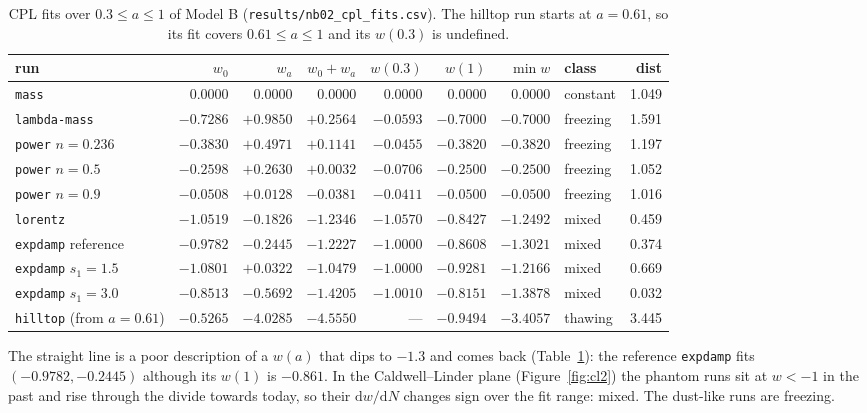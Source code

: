 \documentclass[11pt,a4paper]{article}
\newcommand{\dd}{\mathrm{d}}
\begin{document}
\begin{table}[htbp]
\centering\small
\caption{CPL fits over $0.3\le a\le1$ of Model B (\texttt{results/nb02\_cpl\_fits.csv}). The hilltop
run starts at $a=0.61$, so its fit covers $0.61\le a\le1$ and its $w(0.3)$ is undefined.}
\label{tab:fitsB}
\setlength{\tabcolsep}{4pt}
\begin{tabular}{@{}l r r r r r r l r@{}}
\toprule
run & $w_0$ & $w_a$ & $w_0+w_a$ & $w(0.3)$ & $w(1)$ & $\min w$ & class & dist \\
\midrule
\texttt{mass} & $0.0000$ & $0.0000$ & $0.0000$ & $0.0000$ & $0.0000$ & $0.0000$ & constant & 1.049 \\
\texttt{lambda-mass} & $-0.7286$ & $+0.9850$ & $+0.2564$ & $-0.0593$ & $-0.7000$ & $-0.7000$ & freezing & 1.591 \\
\texttt{power} $n=0.236$ & $-0.3830$ & $+0.4971$ & $+0.1141$ & $-0.0455$ & $-0.3820$ & $-0.3820$ & freezing & 1.197 \\
\texttt{power} $n=0.5$ & $-0.2598$ & $+0.2630$ & $+0.0032$ & $-0.0706$ & $-0.2500$ & $-0.2500$ & freezing & 1.052 \\
\texttt{power} $n=0.9$ & $-0.0508$ & $+0.0128$ & $-0.0381$ & $-0.0411$ & $-0.0500$ & $-0.0500$ & freezing & 1.016 \\
\texttt{lorentz} & $-1.0519$ & $-0.1826$ & $-1.2346$ & $-1.0570$ & $-0.8427$ & $-1.2492$ & mixed & 0.459 \\
\texttt{expdamp} reference & $-0.9782$ & $-0.2445$ & $-1.2227$ & $-1.0000$ & $-0.8608$ & $-1.3021$ & mixed & 0.374 \\
\texttt{expdamp} $s_1=1.5$ & $-1.0801$ & $+0.0322$ & $-1.0479$ & $-1.0000$ & $-0.9281$ & $-1.2166$ & mixed & 0.669 \\
\texttt{expdamp} $s_1=3.0$ & $-0.8513$ & $-0.5692$ & $-1.4205$ & $-1.0010$ & $-0.8151$ & $-1.3878$ & mixed & 0.032 \\
\texttt{hilltop} (from $a=0.61$) & $-0.5265$ & $-4.0285$ & $-4.5550$ & --- & $-0.9494$ & $-3.4057$ & thawing & 3.445 \\
\bottomrule
\end{tabular}
\end{table}

The straight line is a poor description of a $w(a)$ that dips to $-1.3$ and comes back
(Table~\ref{tab:fitsB}): the reference \texttt{expdamp} fits $(-0.9782,-0.2445)$ although its
$w(1)$ is $-0.861$. In the Caldwell--Linder plane (Figure~\ref{fig:cl2}) the phantom runs sit at
$w<-1$ in the past and rise through the divide towards today, so their $\dd w/\dd N$ changes sign
over the fit range: mixed. The dust-like runs are freezing.
\end{document}
